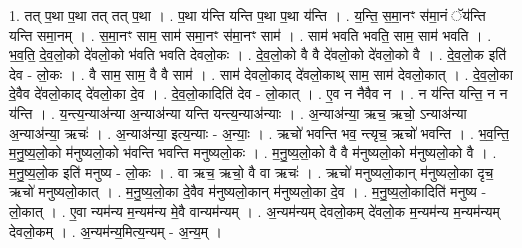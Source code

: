\documentclass[17pt]{extarticle}
\begin{document}
1. तत् प॒था प॒था तत् तत् प॒था । . प॒था य॑न्ति यन्ति प॒था प॒था य॑न्ति । . य॒न्ति॒ स॒मा॒नꣳ स॑मा॒नं ॅय॑न्ति यन्ति समा॒नम् । . स॒मा॒नꣳ साम॒ साम॑ समा॒नꣳ स॑मा॒नꣳ साम॑ । . साम॑ भवति भवति॒ साम॒ साम॑ भवति । . भ॒व॒ति॒ दे॒व॒लो॒को दे॑वलो॒को भ॑वति भवति देवलो॒कः । . दे॒व॒लो॒को वै वै दे॑वलो॒को दे॑वलो॒को वै । . दे॒व॒लो॒क इति॑ देव - लो॒कः । . वै साम॒ साम॒ वै वै साम॑ । . साम॑ देवलो॒काद् दे॑वलो॒काथ् साम॒ साम॑ देवलो॒कात् । . दे॒व॒लो॒का दे॒वैव दे॑वलो॒काद् दे॑वलो॒का दे॒व । . दे॒व॒लो॒कादिति॑ देव - लो॒कात् । . ए॒व न नैवैव न । . न य॑न्ति यन्ति॒ न न य॑न्ति । . य॒न्त्य॒न्याअ॑न्या अ॒न्याअ॑न्या यन्ति यन्त्य॒न्याअ॑न्याः । . अ॒न्याअ॑न्या॒ ऋच॒ ऋचो॒ ऽन्याअ॑न्या अ॒न्याअ॑न्या॒ ऋचः॑ । . अ॒न्याअ॑न्या॒ इत्य॒न्याः - अ॒न्याः॒ । . ऋचो॑ भवन्ति भव॒ न्त्यृच॒ ऋचो॑ भवन्ति । . भ॒व॒न्ति॒ म॒नु॒ष्य॒लो॒को म॑नुष्यलो॒को भ॑वन्ति भवन्ति मनुष्यलो॒कः । . म॒नु॒ष्य॒लो॒को वै वै म॑नुष्यलो॒को म॑नुष्यलो॒को वै । . म॒नु॒ष्य॒लो॒क इति॑ मनुष्य - लो॒कः । . वा ऋच॒ ऋचो॒ वै वा ऋचः॑ । . ऋचो॑ मनुष्यलो॒कान् म॑नुष्यलो॒का दृच॒ ऋचो॑ मनुष्यलो॒कात् । . म॒नु॒ष्य॒लो॒का दे॒वैव म॑नुष्यलो॒कान् म॑नुष्यलो॒का दे॒व । . म॒नु॒ष्य॒लो॒कादिति॑ मनुष्य - लो॒कात् । . ए॒वा न्यम॑न्य म॒न्यम॑न्य मे॒वै वान्यम॑न्यम् । . अ॒न्यम॑न्यम् देवलो॒कम् दे॑वलो॒क म॒न्यम॑न्य म॒न्यम॑न्यम् देवलो॒कम् । . अ॒न्यम॑न्य॒मित्य॒न्यम् - अ॒न्य॒म् । \newline
\end{document}
